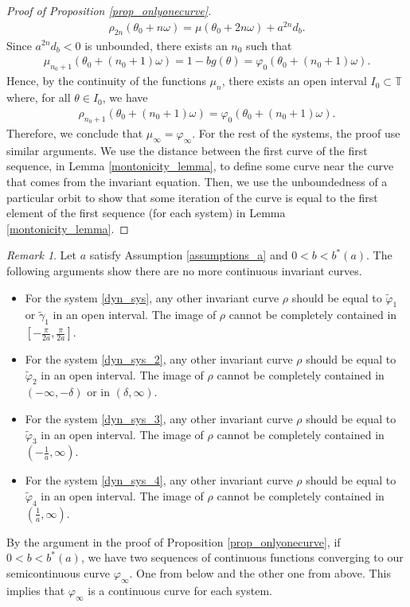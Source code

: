 \documentclass[12pt]{article}
\newcommand{\T}{\mathbb{T}}
\theoremstyle{plain}
\theoremstyle{remark}
\newtheorem{remark}[defn]{Remark}
\theoremstyle{definition}
\begin{document}
\begin{proof}[Proof of Proposition \ref{prop_onlyonecurve}]
    \begin{align*}
        \rho_{2n}(\theta_0+n\omega) = \mu(\theta_0+2n\omega) + a^{2n}  d_b.
    \end{align*}
    Since $a^{2n}  d_b<0$ is unbounded, there exists an $n_0$ such that
    \begin{align*}
        \mu_{n_0+1}(\theta_0+(n_0+1)\omega) = 1 - b g(\theta) = \varphi_0(\theta_0+(n_0+1)\omega).
    \end{align*}
    Hence, by the continuity of the functions $\mu_n$, there exists an open interval $I_0\subset\T$ where, for all $\theta\in I_0$, we have
    \begin{align*}
        \rho_{n_0+1}(\theta_0+(n_0+1)\omega) = \varphi_0(\theta_0+(n_0+1)\omega).
    \end{align*}
    Therefore, we conclude that $\mu_\infty=\varphi_\infty$. For the rest of the systems, the proof use similar arguments. We use the distance between the first curve of the first sequence, in Lemma \ref{montonicity_lemma}, to define some curve near the curve that comes from the invariant equation. Then, we use the unboundedness of a particular orbit to show that some iteration of the curve is equal to the first element of the first sequence (for each system) in Lemma \ref{montonicity_lemma}. 
\end{proof}
\begin{remark}
    Let $a$ satisfy Assumption \eqref{assumptions_a} and $0<b<b^*(a)$. The following arguments show there are no more continuous invariant curves.
    \begin{itemize}
        \item For the system \eqref{dyn_sys}, any other invariant curve $\rho$ should be equal to $\tilde\varphi_1$ or $\tilde\gamma_1$ in an open interval. The image of $\rho$ cannot be completely contained in $[-\frac{\pi}{2a},\frac{\pi}{2a}]$.
        \item For the system \eqref{dyn_sys_2}, any other invariant curve $\rho$ should be equal to $\tilde\varphi_2$ in an open interval. The image of $\rho$ cannot be completely contained in $(-\infty,- \delta)$ or in $( \delta,\infty)$.
        \item For the system \eqref{dyn_sys_3}, any other invariant curve $\rho$ should be equal to $\tilde\varphi_3$ in an open interval. The image of $\rho$ cannot be completely contained in $(-\frac{1}{a},\infty)$.
        \item For the system \eqref{dyn_sys_4}, any other invariant curve $\rho$ should be equal to $\tilde\varphi_4$ in an open interval. The image of $\rho$ cannot be completely contained in $(\frac{1}{a},\infty)$.
    \end{itemize}
\end{remark}
By the argument in the proof of Proposition \ref{prop_onlyonecurve}, if $0<b<b^*(a)$, we have two sequences of continuous functions converging to our semicontinuous curve $\varphi_\infty$. One from below and the other one from above. This implies that $\varphi_\infty$ is a continuous curve for each system. 
\end{document}
